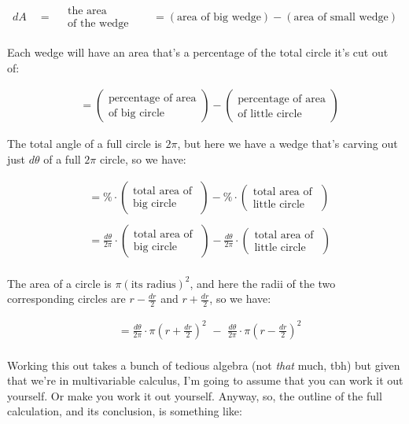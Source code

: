 \documentclass[
]{article}
\begin{document}
\begin{align*}
dA \quad=\quad \substack{\text{the area}\\\text{of the wedge}} \quad&= (\text{area of big wedge}) - (\text{area of small wedge})
\end{align*}

Each wedge will have an area that's a percentage of the total circle it's cut out of:

\begin{align*}
&= (\substack{\text{percentage of area}\\\text{of big circle}}) - (\substack{\text{percentage of area}\\\text{of little circle}})
\end{align*}

The total angle of a full circle is \(2\pi\), but here we have a wedge that's carving out just \(d\theta\) of a full \(2\pi\) circle, so we have:

\begin{align*}
&= \%\cdot\left(\substack{\text{total area of }\\\text{big circle}}\right) - \%\cdot\left(\substack{\text{total area of }\\\text{little circle}}\right) \\ \\
&= \frac{d\theta}{2\pi}\cdot\left(\substack{\text{total area of }\\\text{big circle}}\right) - \frac{d\theta}{2\pi}\cdot\left(\substack{\text{total area of }\\\text{little circle}}\right) \\
\end{align*}

The area of a circle is \(\pi(\text{its radius})^2\), and here the radii of the two corresponding circles are \(r-\frac{dr}{2}\) and \(r+\frac{dr}{2}\), so we have:

\begin{align*}
&= \frac{d\theta}{2\pi}\cdot \pi\left(r+\frac{dr}{2}\right)^2 \,\,-\,\, \frac{d\theta}{2\pi}\cdot\pi\left(r-\frac{dr}{2}\right)^2 \\
\end{align*}

Working this out takes a bunch of tedious algebra (not \emph{that} much, tbh) but given that we're in multivariable calculus, I'm going to assume that you can work it out yourself. Or make you work it out yourself. Anyway, so, the outline of the full calculation, and its conclusion, is something like:
\end{document}
